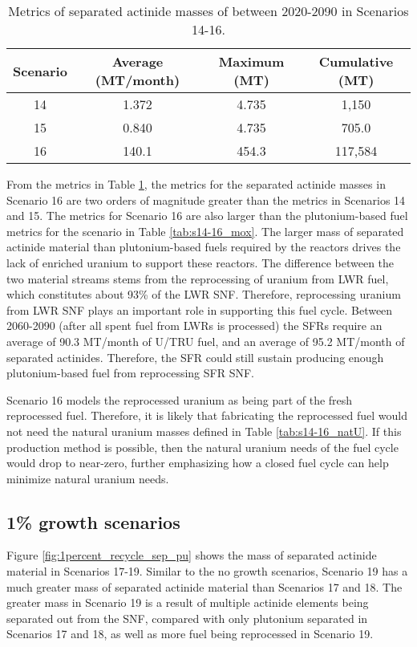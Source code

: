 \begin{table}[h!]
    \centering 
    \caption{Metrics of separated actinide masses of between 2020-2090 in 
    Scenarios 14-16.}
    \label{tab:s14-16_sep_pu}
    \begin{tabular}{c c c c}
        \hline 
        Scenario & Average (MT/month) & Maximum (MT) & Cumulative (MT) \\
        \hline
        14 & 1.372 & 4.735 & 1,150\\
        15 & 0.840 & 4.735 & 705.0\\
        16 & 140.1 & 454.3 & 117,584\\
        \hline
    \end{tabular}
\end{table}

From the metrics in Table \ref{tab:s14-16_sep_pu}, the metrics for 
the separated actinide masses in Scenario 16 are two orders of 
magnitude greater than the metrics in Scenarios 14 and 15. The metrics 
for Scenario 16 are also larger than the plutonium-based fuel metrics 
for the scenario in Table \ref{tab:s14-16_mox}. The larger mass 
of separated actinide material than plutonium-based fuels required by 
the reactors drives the lack of enriched uranium to support these 
reactors. The difference between the two material streams stems 
from the reprocessing of uranium from \gls{LWR} fuel, which constitutes 
about 93\% of the \gls{LWR} \gls{SNF}. Therefore, reprocessing 
uranium from \gls{LWR} \gls{SNF} plays an important role in supporting 
this fuel cycle. Between 2060-2090 (after all spent fuel from 
\glspl{LWR} is processed) the \glspl{SFR} require an 
average of 90.3 MT/month of U/TRU fuel, and an average of 95.2 
MT/month of separated actinides. Therefore, the \gls{SFR} could 
still sustain producing enough plutonium-based 
fuel from reprocessing \gls{SFR} \gls{SNF}.

Scenario 16 models the reprocessed uranium as being part of 
the fresh reprocessed fuel. Therefore, it is likely that 
fabricating the reprocessed fuel would not need the natural
uranium masses defined in Table \ref{tab:s14-16_natU}. If this 
production method is possible, then the natural uranium needs 
of the fuel cycle would drop to near-zero, further 
emphasizing how a closed fuel cycle can help minimize
natural uranium needs. 

\subsection{1\% growth scenarios}
Figure \ref{fig:1percent_recycle_sep_pu} shows the mass of separated 
actinide material in Scenarios 17-19. Similar to the no growth 
scenarios, Scenario 19 has a much greater mass of separated 
actinide material than Scenarios 17 and 18. The greater mass in 
Scenario 19 is a result of multiple actinide elements being 
separated out from the \gls{SNF}, compared with only 
plutonium separated in Scenarios 17 and 18, as well as more fuel 
being reprocessed in Scenario 19. 

